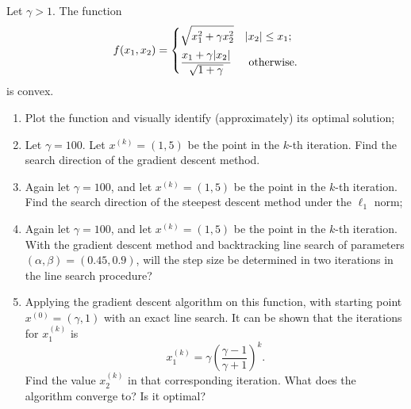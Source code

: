 \documentclass[11pt]{article}
\begin{document}
\begin{homeworkProblem}

    Let $\gamma > 1$. The function
    \[
        f(x_1, x_2) = \begin{dcases}
            \sqrt{x_1^2 + \gamma x_2^2}                   & |x_2| \leq x_1 ;    \\
            \frac{x_1 + \gamma |x_2|}{\sqrt{1 + \gamma} } & \text{ otherwise} .
        \end{dcases}
    \]
    is convex.
    \begin{enumerate}[label=(\alph*), topsep=5pt, itemsep=5pt]
        \item Plot the function and visually identify (approximately) its optimal solution;
        \item Let $\gamma = 100$. Let $x^{(k)} = (1, 5)$ be the point in the $k$-th iteration. Find the search
              direction of the gradient descent method.
        \item Again let $\gamma = 100$, and let $x^{(k)} = (1, 5)$ be the point in the $k$-th iteration. Find the
              search direction of the steepest descent method under the $\ell_1$ norm;
        \item Again let $\gamma = 100$, and let $x^{(k)} = (1, 5)$ be the point in the $k$-th iteration. With the
              gradient descent method and backtracking line search of parameters $(\alpha, \beta) = (0.45, 0.9)$,
              will the step size be determined in two iterations in the line search procedure?
        \item Applying the gradient descent algorithm on this function, with starting point $x^{(0)} =
                  (\gamma, 1)$ with an exact line search. It can be shown that the iterations for $x^{(k)}_1$ is
              \[
                  x_1^{(k)} = \gamma\left(\frac{\gamma - 1}{\gamma + 1}\right)^k .
              \]
              Find the value $x_2^{(k)}$ in that corresponding iteration. What does the algorithm converge to? Is it optimal? \newline
    \end{enumerate}
    \solution

    \begin{figure}[hbpt!]
        \centering
\end{figure}
\end{homeworkProblem}
\end{document}
